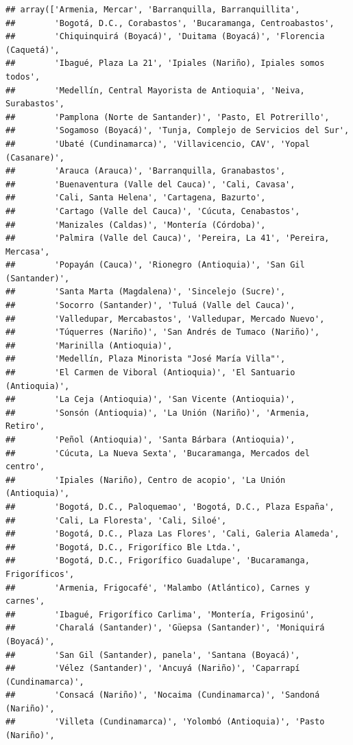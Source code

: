 \documentclass[
]{book}
\begin{document}
\begin{verbatim}
## array(['Armenia, Mercar', 'Barranquilla, Barranquillita',
##        'Bogotá, D.C., Corabastos', 'Bucaramanga, Centroabastos',
##        'Chiquinquirá (Boyacá)', 'Duitama (Boyacá)', 'Florencia (Caquetá)',
##        'Ibagué, Plaza La 21', 'Ipiales (Nariño), Ipiales somos todos',
##        'Medellín, Central Mayorista de Antioquia', 'Neiva, Surabastos',
##        'Pamplona (Norte de Santander)', 'Pasto, El Potrerillo',
##        'Sogamoso (Boyacá)', 'Tunja, Complejo de Servicios del Sur',
##        'Ubaté (Cundinamarca)', 'Villavicencio, CAV', 'Yopal (Casanare)',
##        'Arauca (Arauca)', 'Barranquilla, Granabastos',
##        'Buenaventura (Valle del Cauca)', 'Cali, Cavasa',
##        'Cali, Santa Helena', 'Cartagena, Bazurto',
##        'Cartago (Valle del Cauca)', 'Cúcuta, Cenabastos',
##        'Manizales (Caldas)', 'Montería (Córdoba)',
##        'Palmira (Valle del Cauca)', 'Pereira, La 41', 'Pereira, Mercasa',
##        'Popayán (Cauca)', 'Rionegro (Antioquia)', 'San Gil (Santander)',
##        'Santa Marta (Magdalena)', 'Sincelejo (Sucre)',
##        'Socorro (Santander)', 'Tuluá (Valle del Cauca)',
##        'Valledupar, Mercabastos', 'Valledupar, Mercado Nuevo',
##        'Túquerres (Nariño)', 'San Andrés de Tumaco (Nariño)',
##        'Marinilla (Antioquia)',
##        'Medellín, Plaza Minorista "José María Villa"',
##        'El Carmen de Viboral (Antioquia)', 'El Santuario (Antioquia)',
##        'La Ceja (Antioquia)', 'San Vicente (Antioquia)',
##        'Sonsón (Antioquia)', 'La Unión (Nariño)', 'Armenia, Retiro',
##        'Peñol (Antioquia)', 'Santa Bárbara (Antioquia)',
##        'Cúcuta, La Nueva Sexta', 'Bucaramanga, Mercados del centro',
##        'Ipiales (Nariño), Centro de acopio', 'La Unión (Antioquia)',
##        'Bogotá, D.C., Paloquemao', 'Bogotá, D.C., Plaza España',
##        'Cali, La Floresta', 'Cali, Siloé',
##        'Bogotá, D.C., Plaza Las Flores', 'Cali, Galeria Alameda',
##        'Bogotá, D.C., Frigorífico Ble Ltda.',
##        'Bogotá, D.C., Frigorífico Guadalupe', 'Bucaramanga, Frigoríficos',
##        'Armenia, Frigocafé', 'Malambo (Atlántico), Carnes y carnes',
##        'Ibagué, Frigorífico Carlima', 'Montería, Frigosinú',
##        'Charalá (Santander)', 'Güepsa (Santander)', 'Moniquirá (Boyacá)',
##        'San Gil (Santander), panela', 'Santana (Boyacá)',
##        'Vélez (Santander)', 'Ancuyá (Nariño)', 'Caparrapí (Cundinamarca)',
##        'Consacá (Nariño)', 'Nocaima (Cundinamarca)', 'Sandoná (Nariño)',
##        'Villeta (Cundinamarca)', 'Yolombó (Antioquia)', 'Pasto (Nariño)',

\end{verbatim}
\end{document}
